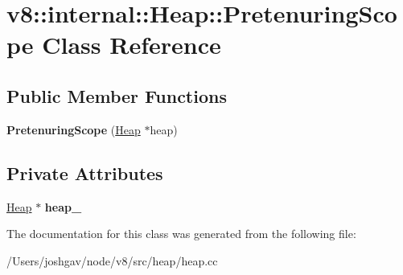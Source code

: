\hypertarget{classv8_1_1internal_1_1_heap_1_1_pretenuring_scope}{}\section{v8\+:\+:internal\+:\+:Heap\+:\+:Pretenuring\+Scope Class Reference}
\label{classv8_1_1internal_1_1_heap_1_1_pretenuring_scope}
\subsection*{Public Member Functions}
\begin{DoxyCompactItemize}
\item 
{\bfseries Pretenuring\+Scope} (\hyperlink{classv8_1_1internal_1_1_heap}{Heap} $\ast$heap)\hypertarget{classv8_1_1internal_1_1_heap_1_1_pretenuring_scope_a9e4a81af4ddcaa80cf9a7b95cf05e48f}{}\label{classv8_1_1internal_1_1_heap_1_1_pretenuring_scope_a9e4a81af4ddcaa80cf9a7b95cf05e48f}

\end{DoxyCompactItemize}
\subsection*{Private Attributes}
\begin{DoxyCompactItemize}
\item 
\hyperlink{classv8_1_1internal_1_1_heap}{Heap} $\ast$ {\bfseries heap\+\_\+}\hypertarget{classv8_1_1internal_1_1_heap_1_1_pretenuring_scope_ab04fb7f19ab748812e677daa0b6f9c5a}{}\label{classv8_1_1internal_1_1_heap_1_1_pretenuring_scope_ab04fb7f19ab748812e677daa0b6f9c5a}

\end{DoxyCompactItemize}


The documentation for this class was generated from the following file\+:\begin{DoxyCompactItemize}
\item 
/\+Users/joshgav/node/v8/src/heap/heap.\+cc\end{DoxyCompactItemize}
